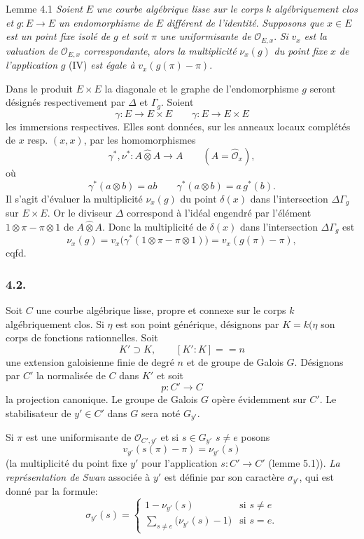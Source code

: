 \begin{statement}{Lemme 4.1}
\emph{Soient} $E$ \emph{une courbe algébrique lisse sur le corps} $k$ \emph{algébriquement clos et} $g:E\to E$ \emph{un endomorphisme de} $E$ \emph{différent de l'identité}. \emph{Supposons que} $x\in E$ \emph{est un point fixe isolé de} $g$ \emph{et soit} $\pi$ \emph{une uniformisante de} $\mathcal{O}_{E,x}$. \emph{Si} $v_x$ \emph{est la valuation de} $\mathcal{O}_{E,x}$ \emph{correspondante}, \emph{alors la multiplicité} $\nu_x(g)$ \emph{du point fixe} $x$ \emph{de l'application} $g$ (IV) \emph{est égale à} $v_x(g(\pi)-\pi)$.
\end{statement}


Dans le produit $E\times E$ la diagonale et le graphe de l'endomorphisme $g$ seront désignés respectivement par $\Delta$ et $\Gamma_g$. Soient
\[
\gamma:E\longrightarrow E\times E\qquad
\gamma:E\longrightarrow E\times E
\]
les immersions respectives. Elles sont données, sur les anneaux locaux complétés de $x$ resp. $(x,x)$, par les homomorphismes
\[
\gamma^*,\nu^*:A\widehat\otimes A\longrightarrow A
\qquad (A=\widehat{\mathcal{O}}_x),
\]
où
\[
\gamma^*(a\otimes b)=ab\qquad
\gamma^*(a\otimes b)=a\,g^*(b).
\]
Il s'agit d'évaluer la multiplicité $\nu_x(g)$ du point $\delta(x)$ dans l'intersection $\Delta\Gamma_g$ sur $E\times E$. Or le diviseur $\Delta$ correspond à l'idéal engendré par l'élément $1\otimes\pi-\pi\otimes1$ de $A\widehat\otimes A$. Donc la multiplicité de $\delta(x)$ dans l'intersection $\Delta\Gamma_g$ est
\[
\nu_x(g)=v_x\bigl(\gamma^*(1\otimes\pi-\pi\otimes1)\bigr)
      =v_x(g(\pi)-\pi),
\]
cqfd.

\subsubsection*{4.2.}

Soit $C$ une courbe algébrique lisse, propre et connexe sur le corps $k$ algébriquement clos. Si $\eta$ est son point générique, désignons par $K=k(\eta$ son corps de fonctions rationnelles.
Soit
\[
K'\supset K,\qquad [K':K]==n
\]
une extension galoisienne finie de degré $n$ et de groupe de Galois $G$. Désignons par $C'$ la normalisée de $C$ dans $K'$ et soit
\[
p:C'\longrightarrow C
\]
la
projection canonique. Le groupe de Galois $G$ opère évidemment sur $C'$. Le stabilisateur de $y'\in C'$ dans $G$ sera noté $G_{y'}$.

Si $\pi$ est une uniformisante de $\mathcal{O}_{C',y'}$ et si $s\in G_{y'}$ $s\ne e$ posons
\[
v_{y'}(s(\pi)-\pi)=\nu_{y'}(s)
\tag{4.2.1}
\]
(la multiplicité du point fixe $y'$ pour l'application $s:C'\to C'$ (lemme 5.1)).
\emph{La représentation de Swan} associée à $y'$ est définie par son caractère $\sigma_{y'}$, qui est donné par la formule:
\[
\sigma_{y'}(s)=
\begin{cases}
1-\nu_{y'}(s)& \text{si } s\ne e\\[0.4em]
\displaystyle\sum_{s\ne e}\bigl(\nu_{y'}(s)-1\bigr)& \text{si } s=e.
\end{cases}
\tag{4.2.2}
\]

